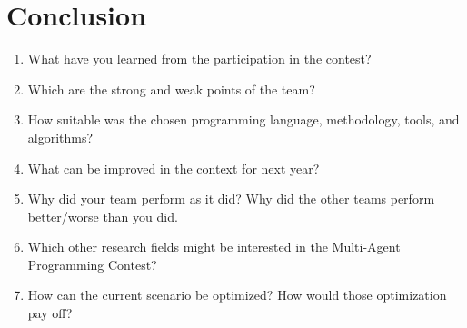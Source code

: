 \documentclass{llncs}
\begin{document}
\section{Conclusion}
\begin{enumerate}
\item What have you learned from the participation in the contest?
\item Which are the strong and weak points of the team?
\item How suitable was the chosen programming language, methodology,
  tools, and algorithms?
\item What can be improved in the context for next year?
\item Why did your team perform as it did? Why did the other teams perform better/worse than you did.
\item Which other research fields might be interested in the Multi-Agent Programming Contest?
\item How can the current scenario be optimized? How would those optimization pay off?
\end{enumerate}
\end{document}
